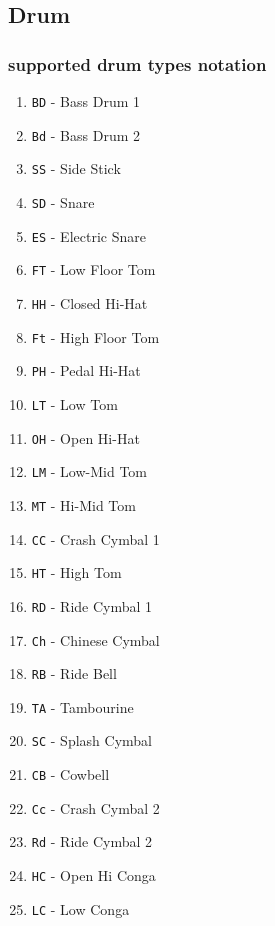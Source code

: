 \documentclass[11pt]{article}
\begin{document}
\subsection{Drum}
\label{sec:org94745bb}
\subsubsection{supported drum types notation}
\label{sec:org15397b7}
\begin{enumerate}
\item \texttt{BD} - Bass Drum 1
\item \texttt{Bd} - Bass Drum 2
\item \texttt{SS} - Side Stick
\item \texttt{SD} - Snare
\item \texttt{ES} - Electric Snare
\item \texttt{FT} - Low Floor Tom
\item \texttt{HH} - Closed Hi-Hat
\item \texttt{Ft} - High Floor Tom
\item \texttt{PH} - Pedal Hi-Hat
\item \texttt{LT} - Low Tom
\item \texttt{OH} - Open Hi-Hat
\item \texttt{LM} - Low-Mid Tom
\item \texttt{MT} - Hi-Mid Tom
\item \texttt{CC} - Crash Cymbal 1
\item \texttt{HT} - High Tom
\item \texttt{RD} - Ride Cymbal 1
\item \texttt{Ch} - Chinese Cymbal
\item \texttt{RB} - Ride Bell
\item \texttt{TA} - Tambourine
\item \texttt{SC} - Splash Cymbal
\item \texttt{CB} - Cowbell
\item \texttt{Cc} - Crash Cymbal 2
\item \texttt{Rd} - Ride Cymbal 2
\item \texttt{HC} - Open Hi Conga
\item \texttt{LC} - Low Conga
\end{enumerate}
\end{document}

